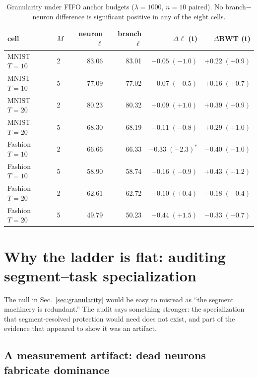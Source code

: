 \documentclass[review,12pt,number]{elsarticle}
\begin{document}
\begin{table}[t]
\centering\small
\caption{Granularity under FIFO anchor budgets ($\lambda{=}1000$, $n{=}10$
paired). No branch$-$neuron difference is significant positive in any of
the eight cells.}
\label{tab:budget}
\begin{tabular}{llrrrr}
\toprule
cell & $M$ & neuron $\ell$ & branch $\ell$ & $\Delta\ell$ (t) & $\Delta$BWT (t) \\
\midrule
MNIST $T{=}10$  & 2 & 83.06 & 83.01 & $-0.05\;(-1.0)$ & $+0.22\;(+0.9)$ \\
MNIST $T{=}10$  & 5 & 77.09 & 77.02 & $-0.07\;(-0.5)$ & $+0.16\;(+0.7)$ \\
MNIST $T{=}20$  & 2 & 80.23 & 80.32 & $+0.09\;(+1.0)$ & $+0.39\;(+0.9)$ \\
MNIST $T{=}20$  & 5 & 68.30 & 68.19 & $-0.11\;(-0.8)$ & $+0.29\;(+1.0)$ \\
Fashion $T{=}10$ & 2 & 66.66 & 66.33 & $-0.33\;(-2.3)^{*}$ & $-0.40\;(-1.0)$ \\
Fashion $T{=}10$ & 5 & 58.90 & 58.74 & $-0.16\;(-0.9)$ & $+0.43\;(+1.2)$ \\
Fashion $T{=}20$ & 2 & 62.61 & 62.72 & $+0.10\;(+0.4)$ & $-0.18\;(-0.4)$ \\
Fashion $T{=}20$ & 5 & 49.79 & 50.23 & $+0.44\;(+1.5)$ & $-0.33\;(-0.7)$ \\
\bottomrule
\end{tabular}
\end{table}

\section{Why the ladder is flat: auditing segment--task specialization}
\label{sec:audit}

The null in Sec.~\ref{sec:granularity} would be easy to misread as ``the
segment machinery is redundant.'' The audit says something stronger: the
specialization that segment-resolved protection would need does not exist,
and part of the evidence that appeared to show it was an artifact.

\subsection{A measurement artifact: dead neurons fabricate dominance}
\label{sec:artifact}
\end{document}
